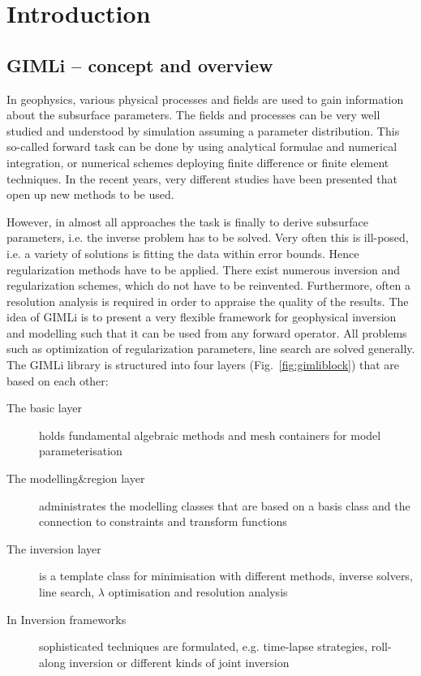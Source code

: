 \section{Introduction}\label{sec:intro}
\subsection{GIMLi -- concept and overview}\label{sec:gimli}
In geophysics, various physical processes and fields are used to gain information about the subsurface parameters.
The fields and processes can be very well studied and understood by simulation assuming a parameter distribution.
This so-called forward task can be done by using analytical formulae and numerical integration, or numerical schemes deploying finite difference or finite element techniques.
In the recent years, very different studies have been presented that open up new methods to be used.

However, in almost all approaches the task is finally to derive subsurface parameters, i.e. the inverse problem has to be solved.
Very often this is ill-posed, i.e. a variety of solutions is fitting the data within error bounds.
Hence regularization methods have to be applied.
There exist numerous inversion and regularization schemes, which do not have to be reinvented.
Furthermore, often a resolution analysis is required in order to appraise the quality of the results.
The idea of GIMLi is to present a very flexible framework for geophysical inversion and modelling such that it can be used from any forward operator.
All problems such as optimization of regularization parameters, line search are solved generally.
The GIMLi library is structured into four layers (Fig.~\ref{fig:gimliblock}) that are based on each other:

\begin{description}
	\item[The basic layer] holds fundamental algebraic methods and mesh containers for model parameterisation 
	\item[The modelling\&region layer] administrates the modelling classes that are based on a basis class and the connection to constraints and transform functions
	\item[The inversion layer] is a template class for minimisation with different methods, inverse solvers, line search, $\lambda$ optimisation and resolution analysis
	\item[In Inversion frameworks] sophisticated techniques are formulated, e.g. time-lapse strategies, roll-along inversion or different kinds of joint inversion
\end{description}

